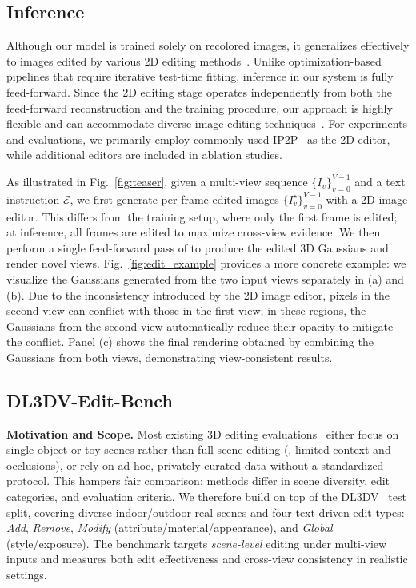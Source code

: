 \subsection{Inference}
Although our model is trained solely on recolored images, it generalizes effectively to images edited by various 2D editing methods~\cite{ip2p, labs2025flux1kontextflowmatching}.  
Unlike optimization-based pipelines that require iterative test-time fitting, inference in our system is fully feed-forward.  
Since the 2D editing stage operates independently from both the feed-forward reconstruction and the training procedure, our approach is highly flexible and can accommodate diverse image editing techniques~\cite{gpt4o, labs2025flux1kontextflowmatching, geminiteam2025geminifamilyhighlycapable}.  
For experiments and evaluations, we primarily employ commonly used IP2P~\cite{ip2p} as the 2D editor, while additional editors are included in ablation studies.  

As illustrated in Fig.~\ref{fig:teaser}, given a multi-view sequence \(\{I_v\}_{v=0}^{V-1}\) and a text instruction \(\mathcal{E}\), we first generate per-frame edited images \(\{I_v^\star\}_{v=0}^{V-1}\) with a 2D image editor.  
This differs from the training setup, where only the first frame is edited; at inference, all frames are edited to maximize cross-view evidence.  
We then perform a single feed-forward pass of {\ourmethod} to produce the edited 3D Gaussians and render novel views.
Fig.~\ref{fig:edit_example} provides a more concrete example: we visualize the Gaussians generated from the two input views separately in (a) and (b). 
Due to the inconsistency introduced by the 2D image editor, pixels in the second view can conflict with those in the first view; in these regions, the Gaussians from the second view automatically reduce their opacity to mitigate the conflict. 
Panel (c) shows the final rendering obtained by combining the Gaussians from both views, demonstrating view-consistent results.

\subsection{DL3DV-Edit-Bench}
\vspace{1mm}
\noindent\textbf{Motivation and Scope.}
Most existing 3D editing evaluations~\cite{in2n} either focus on single-object or toy scenes rather than full scene editing (\eg, limited context and occlusions), or rely on ad-hoc, privately curated data without a standardized protocol. This hampers fair comparison: methods differ in scene diversity, edit categories, and evaluation criteria. 
We therefore build \textbf{{\ourbench}} on top of the DL3DV~\cite{ling2023dl3dv10klargescalescenedataset} test split, covering diverse indoor/outdoor real scenes and four text-driven edit types: \emph{Add}, \emph{Remove}, \emph{Modify} (attribute/material/appearance), and \emph{Global} (style/exposure). The benchmark targets \emph{scene-level} editing under multi-view inputs and measures both edit effectiveness and cross-view consistency in realistic settings.

